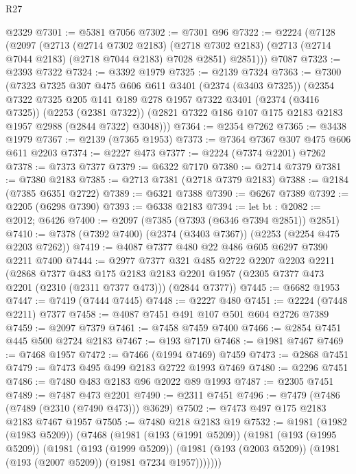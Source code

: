 \begin{lexlean}{R27}
\begin{coremodule}
    @2329
@7301 := @5381 @7056
@7302 := @7301 @96
@7322 := @2224
    (@7128
      (@2097
        (@2713
          (@2714 @7302 @2183)
          (@2718 @7302 @2183)
          (@2713 (@2714 @7044 @2183) (@2718 @7044 @2183) @7028 @2851)
          @2851)))
    @7087
@7323 := @2393 @7322
@7324 := @3392 @1979
@7325 := @2139 @7324
@7363 := @7300
    (@7323
      @7325
      @307
      @475
      @606
      @611
      @3401
      (@2374 (@3403 @7325))
      (@2354
        @7322
        @7325
        @205
        @141
        @189
        @278
        @1957
        @7322
        @3401
        (@2374 (@3416 @7325))
        (@2253 (@2381 @7322))
        (@2821 @7322 @186 @107 @175 @2183 @2183 @1957 @2988 (@2844 @7322) @3048)))
@7364 := @2354 @7262
@7365 := @3438 @1979
@7367 := @2139 (@7365 @1953)
@7373 := @7364 @7367 @307 @475 @606 @611 @2203
@7374 := @2227 @473
@7377 := @2224 (@7374 @2201) @7262
@7378 := @7373 @7377
@7379 := @6322 @7170
@7380 := @2714 @7379
@7381 := @7380 @2183
@7385 := @2713 @7381 (@2718 @7379 @2183)
@7388 := @2184 (@7385 @6351 @2722)
@7389 := @6321 @7388
@7390 := @6267 @7389
@7392 := @2205 (@6298 @7390)
@7393 := @6338 @2183
@7394 := let bt : @2082 := @2012; @6426
@7400 := @2097 (@7385 (@7393 (@6346 @7394 @2851)) @2851)
@7410 := @7378 (@7392 @7400) (@2374 (@3403 @7367)) (@2253 (@2254 @475 @2203 @7262))
@7419 := @4087 @7377 @480 @22 @486 @605 @6297 @7390 @2211 @7400
@7444 := @2977
    @7377
    @321
    @485
    @2722
    @2207
    @2203
    @2211
    (@2868
      @7377
      @483
      @175
      @2183
      @2183
      @2201
      @1957
      (@2305 @7377 @473 @2201 (@2310 (@2311 @7377 @473)))
      (@2844 @7377))
@7445 := @6682 @1953
@7447 := @7419 (@7444 @7445)
@7448 := @2227 @480
@7451 := @2224 (@7448 @2211) @7377
@7458 := @4087 @7451 @491 @107 @501 @604 @2726 @7389
@7459 := @2097 @7379
@7461 := @7458 @7459 @7400
@7466 := @2854 @7451 @445 @500 @2724 @2183
@7467 := @193 @7170
@7468 := @1981 @7467
@7469 := @7468 @1957
@7472 := @7466 (@1994 @7469) @7459
@7473 := @2868 @7451
@7479 := @7473 @495 @499 @2183 @2722 @1993 @7469
@7480 := @2296 @7451
@7486 := @7480 @483 @2183 @96 @2022 @89 @1993
@7487 := @2305 @7451
@7489 := @7487 @473 @2201
@7490 := @2311 @7451
@7496 := @7479 (@7486 (@7489 (@2310 (@7490 @473))) @3629)
@7502 := @7473 @497 @175 @2183 @2183 @7467 @1957
@7505 := @7480 @218 @2183 @19
@7532 := @1981
    (@1982 (@1983 @5209))
    (@7468
      (@1981
        (@193 (@1991 @5209))
        (@1981
          (@193 (@1995 @5209))
          (@1981
            (@193 (@1999 @5209))
            (@1981 (@193 (@2003 @5209)) (@1981 (@193 (@2007 @5209)) (@1981 @7234 @1957)))))))

\end{coremodule}
\end{lexlean}
